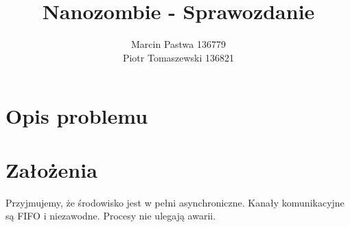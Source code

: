 \documentclass[a4paper]{article}
\title{Nanozombie - Sprawozdanie}
\author{Marcin Pastwa 136779\\
Piotr Tomaszewski 136821 }
\date{}
\begin{document}
\maketitle
\section{Opis problemu}
\section{Założenia}
Przyjmujemy, że środowisko jest w pełni asynchroniczne. Kanały komunikacyjne są FIFO i niezawodne. Procesy nie ulegają awarii.
\end{document}
